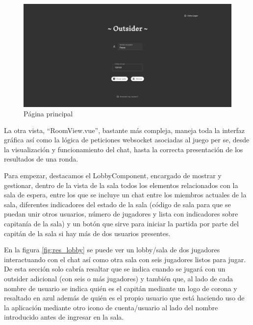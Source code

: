 \begin{figure}[h]
	\centering
	\includegraphics[width=\textwidth,clip=true]{res_mainpage.png}
	\caption{Página principal}
	\label{fig:res_mainpage}
\end{figure}

La otra vista, ``RoomView.vue'', bastante más compleja, maneja toda la interfaz gráfica así como la lógica de peticiones websocket asociadas al juego per se, desde la
visualización y funcionamiento del chat, hasta la correcta presentación de los resultados de una ronda.

Para empezar, destacamos el LobbyComponent, encargado de mostrar y gestionar, dentro de la vista de la sala todos los elementos relacionados con la sala de espera, entre los que se
incluye un chat entre los miembros actuales de la sala, diferentes indicadores del estado de la sala (código de sala para que se puedan unir otros usuarios, número de jugadores y
lista con indicadores sobre capitanía de la sala) y un botón que sirve para iniciar la partida por parte del capitán de la sala si hay más de dos usuarios presentes.

En la figura \ref{fig:res_lobby} se puede ver un lobby/sala de dos jugadores interactuando con el chat así como otra sala con seis jugadores listos para jugar. De esta sección solo
cabría resaltar que se indica cuando se jugará con un outsider adicional (con seis o más jugadores) y también que, al lado de cada nombre de usuario se indica quién es el capitán mediante
un logo de corona y resaltado en azul además de quién es el propio usuario que está haciendo uso de la aplicación mediante otro icono de cuenta/usuario al lado del nombre introducido
antes de ingresar en la sala.

